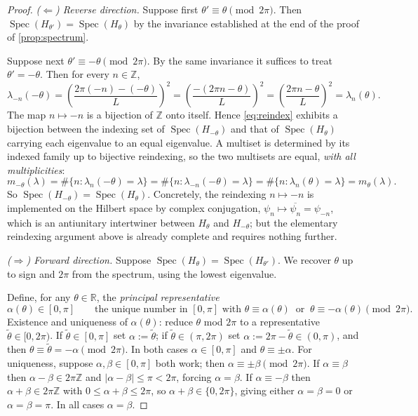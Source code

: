 \documentclass[11pt,reqno]{amsart}
\theoremstyle{plain}
\theoremstyle{definition}
\newcommand{\Rr}{\mathbb{R}}
\newcommand{\Zz}{\mathbb{Z}}
\newcommand{\Spec}{\operatorname{Spec}}
\begin{document}
\begin{proof}
\emph{($\Leftarrow$) Reverse direction.} Suppose first $\theta'\equiv\theta\pmod{2\pi}$. Then
$\Spec(H_{\theta'})=\Spec(H_\theta)$ by the invariance established at the end of the proof of
\cref{prop:spectrum}.

Suppose next $\theta'\equiv-\theta \pmod{2\pi}$. By the same invariance it suffices to treat
$\theta'=-\theta$. Then for every $n\in\Zz$,
\begin{equation}\label{eq:reindex}
\lambda_{-n}(-\theta)
=\left(\frac{2\pi(-n)-(-\theta)}{L}\right)^{\!2}
=\left(\frac{-(2\pi n-\theta)}{L}\right)^{\!2}
=\left(\frac{2\pi n-\theta}{L}\right)^{\!2}
=\lambda_n(\theta).
\end{equation}
The map $n\mapsto -n$ is a bijection of $\Zz$ onto itself. Hence \eqref{eq:reindex} exhibits a
bijection between the indexing set of $\Spec(H_{-\theta})$ and that of $\Spec(H_\theta)$ carrying
each eigenvalue to an equal eigenvalue. A multiset is determined by its indexed family up to
bijective reindexing, so the two multisets are equal, \emph{with all multiplicities}:
\begin{equation*}
m_{-\theta}(\lambda)=\#\{n:\lambda_n(-\theta)=\lambda\}
=\#\{n:\lambda_{-n}(-\theta)=\lambda\}
=\#\{n:\lambda_{n}(\theta)=\lambda\}=m_\theta(\lambda).
\end{equation*}
So $\Spec(H_{-\theta})=\Spec(H_\theta)$. Concretely, the reindexing $n\mapsto -n$ is implemented
on the Hilbert space by complex conjugation, $\psi_n\mapsto\overline{\psi_n}=\psi_{-n}$, which is
an antiunitary intertwiner between $H_\theta$ and $H_{-\theta}$; but the elementary
reindexing argument above is already complete and requires nothing further.

\emph{($\Rightarrow$) Forward direction.} Suppose $\Spec(H_\theta)=\Spec(H_{\theta'})$. We
recover $\theta$ up to sign and $2\pi$ from the spectrum, using the lowest eigenvalue.

Define, for any $\theta\in\Rr$, the \emph{principal representative}
\begin{equation}\label{eq:alpha}
\alpha(\theta)\in[0,\pi]
\qquad\text{the unique number in } [0,\pi] \text{ with }
\theta\equiv\alpha(\theta) \ \text{ or }\ \theta\equiv-\alpha(\theta) \pmod{2\pi}.
\end{equation}
Existence and uniqueness of $\alpha(\theta)$: reduce $\theta$ mod $2\pi$ to a representative
$\tilde\theta\in[0,2\pi)$. If $\tilde\theta\in[0,\pi]$ set $\alpha:=\tilde\theta$; if
$\tilde\theta\in(\pi,2\pi)$ set $\alpha:=2\pi-\tilde\theta\in(0,\pi)$, and then
$\theta\equiv\tilde\theta=-\alpha \pmod{2\pi}$. In both cases $\alpha\in[0,\pi]$ and
$\theta\equiv\pm\alpha$. For uniqueness, suppose $\alpha,\beta\in[0,\pi]$ both work; then
$\alpha\equiv\pm\beta\pmod{2\pi}$. If $\alpha\equiv\beta$ then $\alpha-\beta\in 2\pi\Zz$ and
$|\alpha-\beta|\leq\pi<2\pi$, forcing $\alpha=\beta$. If $\alpha\equiv-\beta$ then
$\alpha+\beta\in2\pi\Zz$ with $0\le\alpha+\beta\le 2\pi$, so $\alpha+\beta\in\{0,2\pi\}$, giving
either $\alpha=\beta=0$ or $\alpha=\beta=\pi$. In all cases $\alpha=\beta$.


\end{proof}
\end{document}

